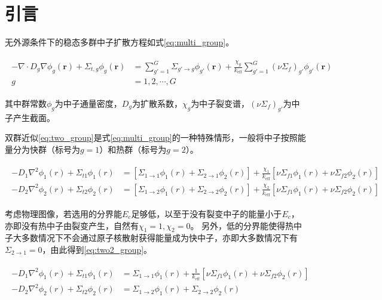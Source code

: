 \section{引言}

无外源条件下的稳态多群中子扩散方程如式\ref{eq:multi_group}。

\begin{align}
    \label{eq:multi_group}
    \begin{split}
        -\nabla\cdot D_g\nabla\phi_g(\pmb{r}) + \Sigma_{t,g}\phi_g(\pmb{r}) &= \sum_{g'=1}^G\Sigma_{g'\rightarrow g}\phi_{g'}(\pmb{r}) + \frac{\chi_g}{k_\mathrm{eff}}\sum_{g'=1}^G(\nu\Sigma_f)_{g'}\phi_{g'}(\pmb{r}) \\
        g &= 1,2,\cdots,G
    \end{split}
\end{align}

其中群常数$\phi_g$为中子通量密度，$D_g$为扩散系数，$\chi_g$为中子裂变谱，$(\nu\Sigma_f)_{g'}$为中子产生截面。

双群近似\ref{eq:two_group}是式\ref{eq:multi_group}的一种特殊情形，一般将中子按照能量分为快群（标号为$g=1$）和热群（标号为$g=2$）。

\begin{align}
    \label{eq:two_group}
    \begin{split}
        -D_1\nabla^2\phi_1(r) + \Sigma_{t1}\phi_1(r) &= \left[\Sigma_{1\rightarrow 1}\phi_1(r) + \Sigma_{2\rightarrow 1}\phi_2(r)\right] + \frac{\chi_1}{k_\mathrm{eff}}\left[\nu\Sigma_{f1}\phi_1(r)+\nu\Sigma_{f2}\phi_2(r)\right] \\
        -D_2\nabla^2\phi_2(r) + \Sigma_{t2}\phi_2(r) &= \left[\Sigma_{1\rightarrow 2}\phi_1(r) + \Sigma_{2\rightarrow 2}\phi_2(r)\right] + \frac{\chi_2}{k_\mathrm{eff}}\left[\nu\Sigma_{f1}\phi_1(r)+\nu\Sigma_{f2}\phi_2(r)\right]
    \end{split}
\end{align}

考虑物理图像，若选用的分界能$E_c$足够低，以至于没有裂变中子的能量小于$E_c$，亦即没有热中子由裂变产生，自然有$\chi_1=1,\chi_2=0$。
另外，低的分界能使得热中子大多数情况下不会通过原子核散射获得能量成为快中子，亦即大多数情况下有$\Sigma_{2\rightarrow 1}=0$，由此得到\ref{eq:two2_group}。

\begin{align}
    \label{eq:two2_group}
    \begin{split}
        -D_1\nabla^2\phi_1(r) + \Sigma_{t1}\phi_1(r) &= \Sigma_{1\rightarrow 1}\phi_1(r) + \frac{1}{k_\mathrm{eff}}\left[\nu\Sigma_{f1}\phi_1(r)+\nu\Sigma_{f2}\phi_2(r)\right] \\
        -D_2\nabla^2\phi_2(r) + \Sigma_{t2}\phi_2(r) &= \Sigma_{1\rightarrow 2}\phi_1(r) + \Sigma_{2\rightarrow 2}\phi_2(r)
    \end{split}
\end{align}

